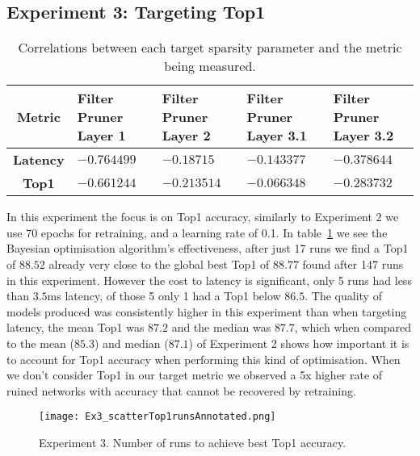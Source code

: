 \documentclass[../Dissertation.tex]{subfiles}
\begin{document}
\subsection{Experiment 3: Targeting Top1}\label{sec:exp3}

\singlespacing
\begin{table}[H]
    \centering
    \begin{tabular}{@{}cp{26mm}p{26mm}p{26mm}p{26mm}@{}}
    \toprule
    \textbf{Metric}  & \textbf{Filter Pruner  Layer 1} & \textbf{Filter Pruner Layer 2} & \textbf{Filter Pruner Layer 3.1} & \textbf{Filter Pruner Layer 3.2} \\ \midrule
    \textbf{Latency} & $-0.764499$                        & $-0.18715$                      & $-0.143377$                         & $-0.378644$                         \\
    \textbf{Top1}    & $-0.661244$                        & $-0.213514$                      & $-0.066348$                        & $-0.283732$                        \\ \bottomrule
    \end{tabular}
    \caption{Correlations between each target sparsity parameter and the metric being measured.}
    \label{tab:Ex3PruneCorrelations}
\end{table}
\doublespacing

In this experiment the focus is on Top1 accuracy, similarly to Experiment 2 we use 70 epochs for retraining, and a learning rate of 0.1. 
In table~\ref{fig:ex3Top1Rate} we see the Bayesian optimisation algorithm's effectiveness, after just 17 runs we find a Top1 of $88.52$ already very close to the global best Top1 of $88.77$ found after 147 runs in this experiment.
However the cost to latency is significant, only 5 runs had less than $3.5$ms latency, of those 5 only 1 had a Top1 below $86.5$.
The quality of models produced was consistently higher in this experiment than when targeting latency, the mean Top1 was $87.2$ and the median was $87.7$, which when compared to the mean ($85.3$) and median ($87.1$) of Experiment 2 shows how important it is to account for Top1 accuracy when performing this kind of optimisation.
When we don't consider Top1 in our target metric we observed a 5x higher rate of ruined networks with accuracy that cannot be recovered by retraining.

\begin{figure}[H]
    \centering
    \texttt{[image: Ex3\_scatterTop1runsAnnotated.png]}
    \caption{Experiment 3. Number of runs to achieve best Top1 accuracy.}
    \label{fig:ex3Top1Rate}
\end{figure}
\end{document}
